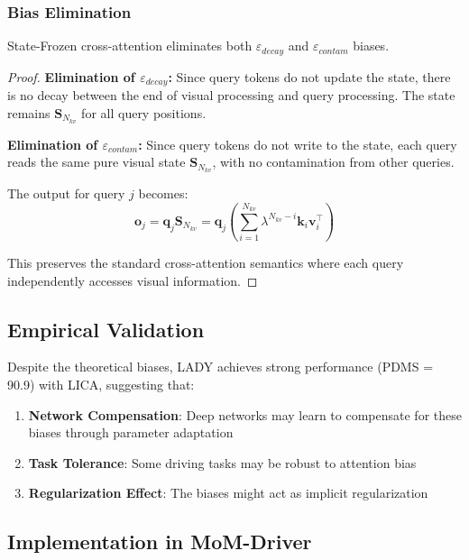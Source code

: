 \subsubsection{Bias Elimination}

\begin{theorem}
State-Frozen cross-attention eliminates both $\varepsilon_{decay}$ and $\varepsilon_{contam}$ biases.
\end{theorem}

\begin{proof}
\textbf{Elimination of $\varepsilon_{decay}$:} Since query tokens do not update the state, there is no decay between the end of visual processing and query processing. The state remains $\mathbf{S}_{N_{kv}}$ for all query positions.

\textbf{Elimination of $\varepsilon_{contam}$:} Since query tokens do not write to the state, each query reads the same pure visual state $\mathbf{S}_{N_{kv}}$, with no contamination from other queries.

The output for query $j$ becomes:
\begin{equation}
\mathbf{o}_j = \mathbf{q}_j \mathbf{S}_{N_{kv}} = \mathbf{q}_j \left(\sum_{i=1}^{N_{kv}} \lambda^{N_{kv}-i} \mathbf{k}_i \mathbf{v}_i^\top \right)
\end{equation}

This preserves the standard cross-attention semantics where each query independently accesses visual information.
\end{proof}

\subsection{Empirical Validation}

Despite the theoretical biases, LADY achieves strong performance (PDMS = 90.9) with LICA, suggesting that:

\begin{enumerate}
    \item \textbf{Network Compensation}: Deep networks may learn to compensate for these biases through parameter adaptation
    \item \textbf{Task Tolerance}: Some driving tasks may be robust to attention bias
    \item \textbf{Regularization Effect}: The biases might act as implicit regularization
\end{enumerate}

\subsection{Implementation in MoM-Driver}


